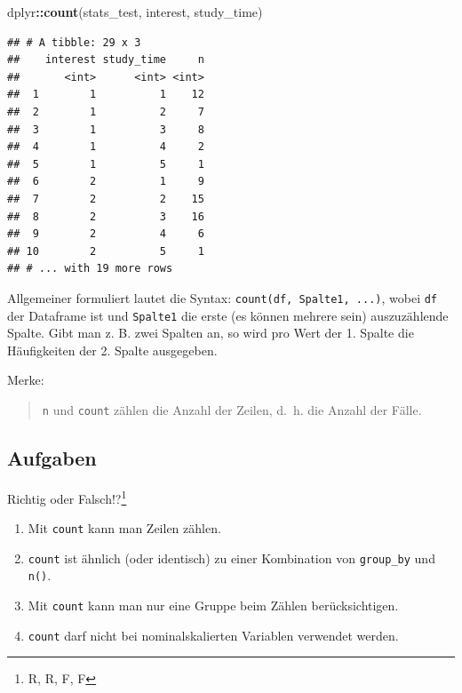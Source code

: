 \documentclass[12pt,ngerman,paper=a4,pagesize,DIV=13]{scrreprt}
\newenvironment{Shaded}{\begin{snugshade}}{\end{snugshade}}
\newcommand{\KeywordTok}[1]{\textcolor[rgb]{0.13,0.29,0.53}{\textbf{#1}}}
\newcommand{\NormalTok}[1]{#1}
\newcommand{\OperatorTok}[1]{\textcolor[rgb]{0.81,0.36,0.00}{\textbf{#1}}}
\providecommand{\tightlist}{%
  \setlength{\itemsep}{0pt}\setlength{\parskip}{0pt}}
\begin{document}
\begin{Shaded}
\begin{Highlighting}[]
\NormalTok{dplyr}\OperatorTok{::}\KeywordTok{count}\NormalTok{(stats_test, interest, study_time)}
\end{Highlighting}
\end{Shaded}

\begin{verbatim}
## # A tibble: 29 x 3
##    interest study_time     n
##       <int>      <int> <int>
##  1        1          1    12
##  2        1          2     7
##  3        1          3     8
##  4        1          4     2
##  5        1          5     1
##  6        2          1     9
##  7        2          2    15
##  8        2          3    16
##  9        2          4     6
## 10        2          5     1
## # ... with 19 more rows
\end{verbatim}

Allgemeiner formuliert lautet die Syntax:
\texttt{count(df,\ Spalte1,\ ...)}, wobei \texttt{df} der Dataframe ist
und \texttt{Spalte1} die erste (es können mehrere sein) auszuzählende
Spalte. Gibt man z. B. zwei Spalten an, so wird pro Wert der 1. Spalte
die Häufigkeiten der 2. Spalte ausgegeben.

Merke:

\begin{quote}
\texttt{n} und \texttt{count} zählen die Anzahl der Zeilen, d.~h. die
Anzahl der Fälle.
\end{quote}

\hypertarget{aufgaben-5}{%
\subsection{Aufgaben}\label{aufgaben-5}}

Richtig oder Falsch!?\footnote{R, R, F, F}

\begin{enumerate}
\def\labelenumi{\arabic{enumi}.}
\tightlist
\item
  Mit \texttt{count} kann man Zeilen zählen.
\item
  \texttt{count} ist ähnlich (oder identisch) zu einer Kombination von
  \texttt{group\_by} und \texttt{n()}.
\item
  Mit \texttt{count} kann man nur eine Gruppe beim Zählen
  berücksichtigen.
\item
  \texttt{count} darf nicht bei nominalskalierten Variablen verwendet
  werden.
\end{enumerate}
\end{document}
